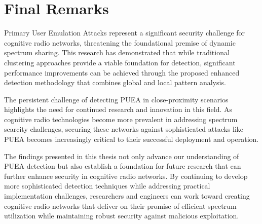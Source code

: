 \section{Final Remarks}

Primary User Emulation Attacks represent a significant security challenge for cognitive radio networks, threatening the foundational premise of dynamic spectrum sharing. This research has demonstrated that while traditional clustering approaches provide a viable foundation for detection, significant performance improvements can be achieved through the proposed enhanced detection methodology that combines global and local pattern analysis.

The persistent challenge of detecting PUEA in close-proximity scenarios highlights the need for continued research and innovation in this field. As cognitive radio technologies become more prevalent in addressing spectrum scarcity challenges, securing these networks against sophisticated attacks like PUEA becomes increasingly critical to their successful deployment and operation.

The findings presented in this thesis not only advance our understanding of PUEA detection but also establish a foundation for future research that can further enhance security in cognitive radio networks. By continuing to develop more sophisticated detection techniques while addressing practical implementation challenges, researchers and engineers can work toward creating cognitive radio networks that deliver on their promise of efficient spectrum utilization while maintaining robust security against malicious exploitation.
